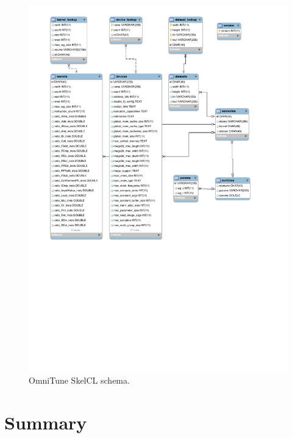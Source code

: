 \begin{figure}
\centering
\includegraphics[width=.75\textwidth]{img/omnitune-data-schema.pdf}
\caption{%
  OmniTune SkelCL schema.%
}
\label{fig:omnitune-system-flow}
\end{figure}


\section{Summary}

\TODO{\ldots}
